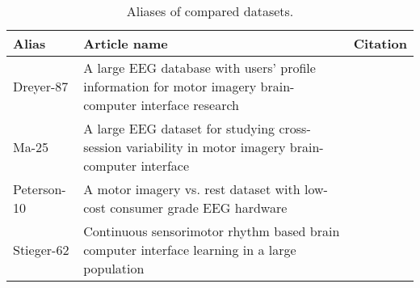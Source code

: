 \documentclass[english, he, bc, kiv, iso690alph]{fasthesis}
\begin{document}
\begin{table}
\centering
\begin{tabular}{@{}p{}p{}p{}@{}}
\toprule
\textbf{Alias} & \textbf{Article name} & \textbf{Citation} \\
\midrule
Dreyer-87 & A large EEG database with users’ profile information for motor imagery brain-computer interface research & \cite{data:dreyer:23} \\
Ma-25 & A large EEG dataset for studying cross-session variability in motor imagery brain-computer interface & \cite{data:ma:22} \\
Peterson-10 & A motor imagery vs. rest dataset with low-cost consumer grade EEG hardware & \cite{data:peterson:22} \\
 Stieger-62 & Continuous sensorimotor rhythm based brain computer interface learning
 in a large population & \cite{data:stieger:21} \\
\bottomrule
\end{tabular}
\caption{Aliases of compared datasets.}
\label{tab:aliases}
\end{table}

\begin{table}
\centering
{}
\caption{Comparison of recent datasets. Note that trials and recording time are usually an approximation made by us or directly the authors of the dataset. The 'Citations' column contains the amount of times the data paper was cited on Web of Science at the time of writing this.}
\label{tab:datasets}
\end{table}
\end{document}

